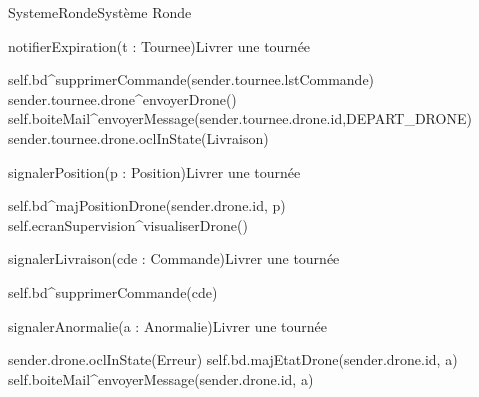 \begin{OM}{SystemeRonde}{Système Ronde}
    \begin{OMOperation}{notifierExpiration(t : Tournee)}{Livrer une tournée}{}
        \begin{OMMessages}
        \end{OMMessages}
        \OMNoPre
        \begin{OMPost}
            self.bd^supprimerCommande(sender.tournee.lstCommande)
            sender.tournee.drone^envoyerDrone()
            self.boiteMail^envoyerMessage(sender.tournee.drone.id,DEPART_DRONE)
            sender.tournee.drone.oclInState(Livraison)
        \end{OMPost}
    \end{OMOperation}

    \begin{OMOperation}{signalerPosition(p : Position)}{Livrer une tournée}{}
        \begin{OMMessages}
        \end{OMMessages}
        \OMNoPre
        \begin{OMPost}
            self.bd^majPositionDrone(sender.drone.id, p)
            self.ecranSupervision^visualiserDrone()
        \end{OMPost}
    \end{OMOperation}

    \begin{OMOperation}{signalerLivraison(cde : Commande)}{Livrer une tournée}{}
        \begin{OMMessages}
        \end{OMMessages}
        \OMNoPre
        \begin{OMPost}
            self.bd^supprimerCommande(cde)
        \end{OMPost}
    \end{OMOperation}

    \begin{OMOperation}{signalerAnormalie(a : Anormalie)}{Livrer une tournée}{}
        \begin{OMMessages}
        \end{OMMessages}
        \OMNoPre
        \begin{OMPost}
            sender.drone.oclInState(Erreur)
            self.bd.majEtatDrone(sender.drone.id, a)
            self.boiteMail^envoyerMessage(sender.drone.id, a)
        \end{OMPost}
    \end{OMOperation}


\end{OM}
